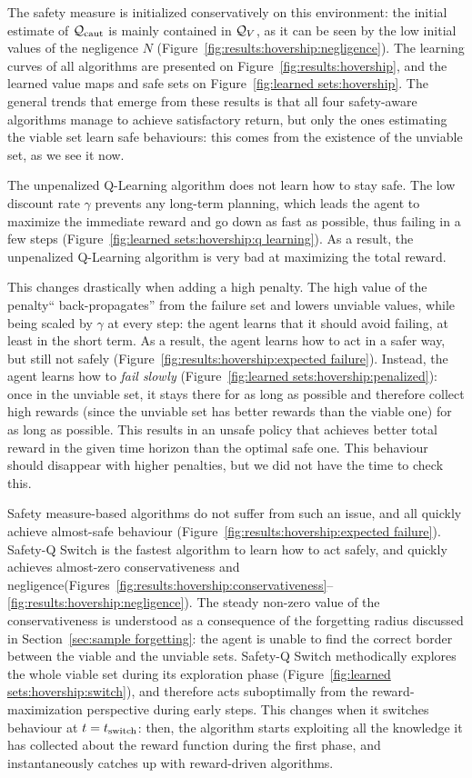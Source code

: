 The safety measure is initialized conservatively on this environment: the initial estimate of $\mathcal{Q}_\text{caut}$ is mainly contained in $\mathcal{Q}_{V}$, as it can be seen by the low initial values of the negligence $N$ (Figure~\ref{fig:results:hovership:negligence}). The learning curves of all algorithms are presented on Figure~\ref{fig:results:hovership}, and the learned value maps and safe sets on Figure~\ref{fig:learned sets:hovership}. The general trends that emerge from these results is that all four safety-aware algorithms manage to achieve satisfactory return, but only the ones estimating the viable set learn safe behaviours: this comes from the existence of the unviable set, as we see it now.\par
The unpenalized Q-Learning algorithm does not learn how to stay safe. The low discount rate $\gamma$ prevents any long-term planning, which leads the agent to maximize the immediate reward and go down as fast as possible, thus failing in a few steps (Figure~\ref{fig:learned sets:hovership:q learning}). As a result, the unpenalized Q-Learning algorithm is very bad at maximizing the total reward. \par
This changes drastically when adding a high penalty. The high value of the penalty\enquote{ back-propagates} from the failure set and lowers unviable values, while being scaled by $\gamma$ at every step: the agent learns that it should avoid failing, at least in the short term. As a result, the agent learns how to act in a safer way, but still not safely (Figure~\ref{fig:results:hovership:expected failure}). Instead, the agent learns how to\emph{ fail slowly} (Figure~\ref{fig:learned sets:hovership:penalized}): once in the unviable set, it stays there for as long as possible and therefore collect high rewards (since the unviable set has better rewards than the viable one) for as long as possible. This results in an unsafe policy that achieves better total reward in the given time horizon than the optimal safe one. This behaviour should disappear with higher penalties, but we did not have the time to check this.\par
Safety measure-based algorithms do not suffer from such an issue, and all quickly achieve almost-safe behaviour (Figure~\ref{fig:results:hovership:expected failure}). Safety-Q Switch is the fastest algorithm to learn how to act safely, and quickly achieves almost-zero conservativeness and negligence(Figures~\ref{fig:results:hovership:conservativeness}--\ref{fig:results:hovership:negligence}). The steady non-zero value of the conservativeness is understood as a consequence of the forgetting radius discussed in Section~\ref{sec:sample forgetting}: the agent is unable to find the correct border between the viable and the unviable sets. Safety-Q Switch methodically explores the whole viable set during its exploration phase (Figure~\ref{fig:learned sets:hovership:switch}), and therefore acts suboptimally from the reward-maximization perspective during early steps. This changes when it switches behaviour at $t=t_\text{switch}$: then, the algorithm starts exploiting all the knowledge it has collected about the reward function during the first phase, and instantaneously catches up with reward-driven algorithms.\par
